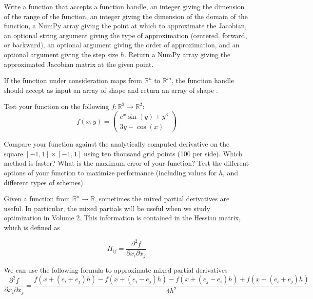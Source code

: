 \begin{problem}
Write a function  that accepts a function handle, an integer giving the dimension of the
range of the function, an integer giving the dimension of the domain of the function, a NumPy array giving
the point at which to approximate the Jacobian, an optional string argument giving the type
of approximation (centered, forward, or backward), an optional argument giving the order of approximation, 
and an optional argument giving the step size $h$.
Return a NumPy array giving the approximated Jacobian matrix at the given point.

If the function under consideration maps from $\mathbb{R}^n$ to $\mathbb{R}^m$, the function handle should
accept as input an array of shape  and return an array of shape .

Test your function on the following $f: \mathbb{R}^2 \to \mathbb{R}^2$:
\begin{equation*}
f(x, y) =
\begin{pmatrix}
e^{x} \sin(y) + y^3 \\
3y - \cos(x)
\end{pmatrix}
\end{equation*}

Compare your  function against the analytically computed derivative on the square $[-1,1] \times [-1,1]$ using ten thousand grid points (100 per side). Which method is faster? What is the maximum error of your function? Test the different options of your function to maximize performance (including values for $h$, and different types of schemes).
\end{problem}

Given a function from $\mathbb{R}^n \to \mathbb{R}$, sometimes the mixed partial derivatives are useful. In particular, the mixed partials will be useful when we study optimization in Volume 2. This information is contained in the Hessian matrix, which is defined as

\begin{equation*}
H_{ij} = \frac{\partial^2 f}{\partial x_i \partial x_j}
\end{equation*}

We can use the following formula to approximate mixed partial derivatives
\small
\begin{equation*}
\frac{\partial^2 f}{\partial x_i \partial x_j} = \frac{f(x + (e_i + e_j)h) - f(x + (e_i-e_j)h) -f(x + (e_j-e_i)h) + f(x - (e_i + e_j)h)}{4h^2}
\end{equation*}
\normalsize

